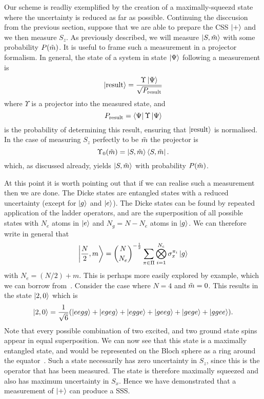 Our scheme is readliy exemplified by the creation of a maximally-squeezd state
where the uncertainty is reduced as far as possible.  Continuing the disccusion
from the previous section, suppose that we are able to prepare the CSS
$\ket{+}$ and we then measure $S_z$. As previously described, we will measure
$\ket{S, \tilde{m}}$ with some probability $P(\tilde{m})$. It is useful to frame
such a measurement in a projector formalism. In general, the state of a system
in state $\ket{\Psi}$ following a measurement is~\cite{gerry_knight_2004}
%
\begin{equation}
  \ket{\text{result}} = \frac{\Upsilon\ket{\Psi}}{\sqrt{P_\text{result}}}
  \label{squeeze:eqn:projresult}
\end{equation}
%
where $\Upsilon$ is a projector into the measured state, and
%
\begin{equation}
  P_\text{result} = \bra{\Psi}\Upsilon\ket{\Psi}
\end{equation}
%
is the probability of determining this result, ensuring that
$\ket{\text{result}}$ is normalised. In the case of measuring $S_z$ perfectly
to be $\tilde{m}$ the projector is 
%
\begin{equation}
  \Upsilon_0(\tilde{m}) = \ket{S, \tilde{m}}\bra{S, \tilde{m}}.
\end{equation}
%
which, as discussed already, yields $\ket{S,\tilde{m}}$ with probability
$P(\tilde{m})$.

At this point it is worth pointing out that if we can realise such a
measurement then we are done. The Dicke states are entangled states with a
reduced uncertainty (except for $\ket{g}$ and $\ket{e}$).  The
Dicke states can be found by repeated application of the ladder operators, and
are the superposition of all possible states with $N_e$ atoms in $\ket{e}$ and 
$N_g = N - N_e$ atoms in $\ket{g}$. We can therefore write in general that
%
\begin{equation}
  \ket{\frac{N}{2}, m} = \binom{N}{N_e}^{-\frac{1}{2}}\sum_{\pi \in \Pi}
  \bigotimes_{i=1}^{N_e} \sigma_x^{\pi_i} \ket{g}
\end{equation}
%
with $N_e=(N/2)+m$.
%
This is perhaps more easily explored by example, which we can 
borrow from~. Consider the case where
$N=4$ and $\tilde{m}=0$. This results in the state $\ket{2, 0}$ which is
%
\begin{equation}
  \ket{2,0} = \frac{1}{\sqrt{6}}(\ket{eegg} + \ket{egeg} + \ket{egge} +
  \ket{geeg} + \ket{gege} + \ket{ggee}).
\end{equation}
%
Note that every possible combination of two excited, and two ground state spins
appear in equal superposition. We can now see that this state is a maximally
entangled state, and would be represented on the Bloch sphere as a ring around
the equator~\cite{Cox2016}.
%
Such a state necessarily has zero uncertainty in $S_z$, since this is the
operator that has been measured. The state is therefore maximally squeezed and
also has maximum uncertainty in $S_x$.  Hence we have demonstrated that a
measurement of $\ket{+}$ can produce a SSS.

